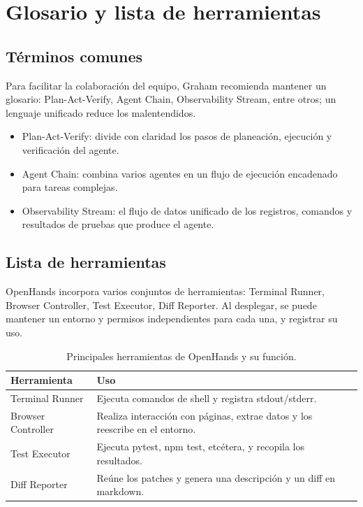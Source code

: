 \section{Glosario y lista de herramientas}
\subsection{Términos comunes}
Para facilitar la colaboración del equipo, Graham recomienda mantener un glosario: Plan-Act-Verify, Agent Chain, Observability Stream, entre otros; un lenguaje unificado reduce los malentendidos.

\begin{itemize}
    \item Plan-Act-Verify: divide con claridad los pasos de planeación, ejecución y verificación del agente.
    \item Agent Chain: combina varios agentes en un flujo de ejecución encadenado para tareas complejas.
    \item Observability Stream: el flujo de datos unificado de los registros, comandos y resultados de pruebas que produce el agente.
\end{itemize}

\subsection{Lista de herramientas}
OpenHands incorpora varios conjuntos de herramientas: Terminal Runner, Browser Controller, Test Executor, Diff Reporter. Al desplegar, se puede mantener un entorno y permisos independientes para cada una, y registrar su uso.

\begin{table}[H]
\centering
\begin{tabular}{p{} p{}}
\toprule
Herramienta & Uso \\
\midrule
Terminal Runner & Ejecuta comandos de shell y registra stdout/stderr. \\
\midrule
Browser Controller & Realiza interacción con páginas, extrae datos y los reescribe en el entorno. \\
\midrule
Test Executor & Ejecuta pytest, npm test, etcétera, y recopila los resultados. \\
\midrule
Diff Reporter & Reúne los patches y genera una descripción y un diff en markdown. \\
\bottomrule
\end{tabular}
\caption{Principales herramientas de OpenHands y su función.}
\end{table}

